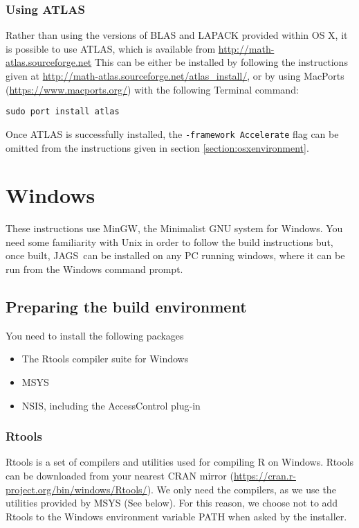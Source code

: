 \documentclass[11pt, a4paper, titlepage]{article}
\newcommand{\JAGS}{\textsf{JAGS}}
\newcommand{\code}[1]{{\bgroup{\normalfont\ttfamily #1}\egroup}}
\begin{document}
\subsubsection{Using ATLAS}

Rather than using the versions of BLAS and LAPACK provided within OS X, it
is possible to use ATLAS, which is available from \url{http://math-atlas.sourceforge.net}
This can be either be installed by following the instructions given at
\url{http://math-atlas.sourceforge.net/atlas_install/}, or by using MacPorts 
(\url{https://www.macports.org/}) with the following Terminal command:

\begin{verbatim}
sudo port install atlas
\end{verbatim}

Once ATLAS is successfully installed, the \texttt{-framework Accelerate} flag can
be omitted from the instructions given in section \ref{section:osxenvironment}.



\clearpage
\section{Windows}
\label{section:windows}

These instructions use MinGW, the Minimalist GNU system for Windows.
You need some familiarity with Unix in order to follow the build
instructions but, once built, \JAGS\ can be installed on any PC
running windows, where it can be run from the Windows command prompt.

\subsection{Preparing the build environment}

You need to install the following packages
\begin{itemize}
\item The Rtools compiler suite for Windows
\item MSYS  
\item NSIS, including the AccessControl plug-in  
\end{itemize}

\subsubsection{Rtools}

Rtools is a set of compilers and utilities used for compiling R on
Windows. Rtools can be downloaded from your nearest CRAN mirror
(\url{https://cran.r-project.org/bin/windows/Rtools/}).  We only need
the compilers, as we use the utilities provided by MSYS (See below).
For this reason, we choose not to add Rtools to the Windows environment
variable \code{PATH} when asked by the installer.
\end{document}
